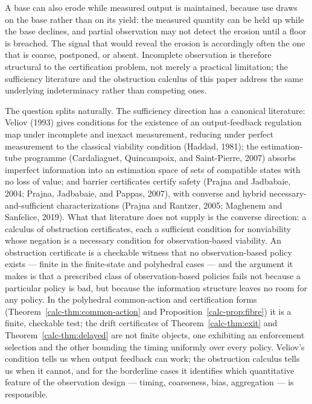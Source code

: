 \documentclass[10pt,twocolumn]{article}
\theoremstyle{definition}
\begin{document}
A base can also erode while measured output is maintained, because
use draws on the base rather than on its yield: the measured quantity
can be held up while the base declines, and partial observation may
not detect the erosion until a floor is breached. The signal that would reveal the erosion is
accordingly often the one that is coarse, postponed, or absent.
Incomplete observation is therefore structural to the certification
problem, not merely a practical limitation; the sufficiency literature
and the obstruction calculus of this paper address the same underlying
indeterminacy rather than competing ones.

The question splits naturally. The sufficiency direction has a canonical literature: Veliov (1993) gives conditions for the existence of an output-feedback regulation map under incomplete and inexact measurement, reducing under perfect measurement to the classical viability condition (Haddad, 1981); the estimation-tube programme (Cardaliaguet, Quincampoix, and Saint-Pierre, 2007) absorbs imperfect information into an estimation space of sets of compatible states with no loss of value; and barrier certificates certify safety (Prajna and Jadbabaie, 2004; Prajna, Jadbabaie, and Pappas, 2007), with converse and hybrid necessary-and-sufficient characterizations (Prajna and Rantzer, 2005; Maghenem and Sanfelice, 2019). What that literature does not supply is the converse direction: a calculus of obstruction certificates, each a sufficient condition for nonviability whose negation is a necessary condition for observation-based viability. An obstruction certificate is a checkable witness that no observation-based policy exists --- finite in the finite-state and polyhedral cases --- and the argument it makes is that a prescribed class of observation-based policies fails not because a particular policy is bad, but because the information structure leaves no room for any policy. In the polyhedral common-action and certification forms (Theorem~\ref{calc-thm:common-action} and Proposition~\ref{calc-prop:fibre}) it is a finite, checkable test; the drift certificates of Theorem~\ref{calc-thm:exit} and Theorem~\ref{calc-thm:delayed} are not finite objects, one exhibiting an enforcement selection and the other bounding the timing uniformly over every policy. Veliov's condition tells us when output feedback can work; the obstruction calculus tells us when it cannot, and for the borderline cases it identifies which quantitative feature of the observation design --- timing, coarseness, bias, aggregation --- is responsible.
\end{document}
